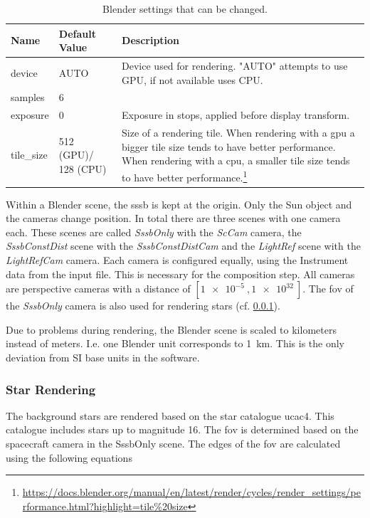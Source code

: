 \begin{table}[htpb]
\caption{Blender settings that can be changed.}
\label{tab:blender_settings_input}
\begin{tabular}{p{}|p{}|p{}}
\textbf{Name}       & \textbf{Default Value} & \textbf{Description} \\ \hline
device     & AUTO          & Device used for rendering. "AUTO" attempts to use GPU, if not available uses CPU. \\
samples    & 6             & \\
exposure   & 0             & Exposure in stops, applied before display transform. \\
tile\_size & 512 (GPU)/ 128 (CPU)       & Size of a rendering tile. When rendering with a \gls{gpu} a bigger tile size tends to have better performance. When rendering with a \gls{cpu}, a smaller tile size tends to have better performance.\footnote{\url{https://docs.blender.org/manual/en/latest/render/cycles/render\_settings/performance.html?highlight=tile\%20size}}
\end{tabular}
\end{table}

Within a Blender scene, the \gls{sssb} is kept at the origin. Only the Sun object and the cameras change position. In total there are three scenes with one camera each. These scenes are called \textit{SssbOnly} with the \textit{ScCam} camera, the \textit{SssbConstDist} scene with the \textit{SssbConstDistCam} and the \textit{LightRef} scene with the \textit{LightRefCam} camera. Each camera is configured equally, using the Instrument data from the input file. This is necessary for the composition step. All cameras are perspective cameras with a distance of $[\SI{1e-5}{},\SI{1e32}{}]$. The \gls{fov} of the \textit{SssbOnly} camera is also used for rendering stars (cf. \ref{sec:stars}).

Due to problems during rendering, the Blender scene is scaled to kilometers instead of meters. I.e. one Blender unit corresponds to \SI{1}{\kilo\meter}. This is the only deviation from SI base units in the software.

\subsubsection{Star Rendering} \label{sec:stars}
The background stars are rendered based on the star catalogue \gls{ucac4}. This catalogue includes stars up to magnitude 16. The \gls{fov} is determined based on the spacecraft camera in the SssbOnly scene. The edges of the \gls{fov} are calculated using the following equations


